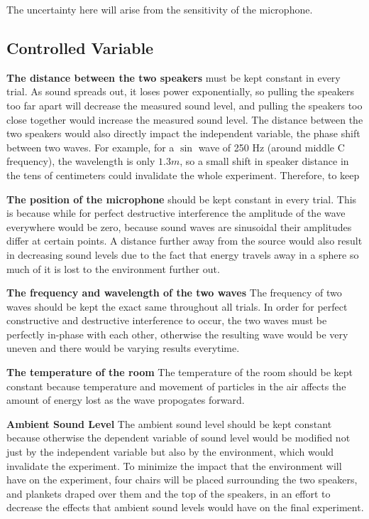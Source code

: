 \documentclass[index]{subfiles}
\begin{document}
The uncertainty here will arise from the sensitivity of the microphone.

\subsection{Controlled Variable}

\textbf{The distance between the two speakers} must be kept constant in every trial. As sound spreads out, it loses power exponentially, so pulling the speakers too far apart will decrease the measured sound level, and pulling the speakers too close together would increase the measured sound level. The distance between the two speakers would also directly impact the independent variable, the phase shift between two waves. For example, for a \(\sin\) wave of 250 Hz (around middle C frequency), the wavelength is only \(1.3m\), so a small shift in speaker distance in the tens of centimeters could invalidate the whole experiment. Therefore, to keep 

\textbf{The position of the microphone} should be kept constant in every trial. This is because while for perfect destructive interference the amplitude of the wave everywhere would be zero, because sound waves are sinusoidal their amplitudes differ at certain points. A distance further away from the source would also result in decreasing sound levels due to the fact that energy travels away in a sphere so much of it is lost to the environment further out.

\textbf{The frequency and wavelength of the two waves} The frequency of two waves should be kept the exact same throughout all trials. In order for perfect constructive and destructive interference to occur, the two waves must be perfectly in-phase with each other, otherwise the resulting wave would be very uneven and there would be varying results everytime.

\textbf{The temperature of the room} The temperature of the room should be kept constant because temperature and movement of particles in the air affects the amount of energy lost as the wave propogates forward.

\textbf{Ambient Sound Level} The ambient sound level should be kept constant because otherwise the dependent variable of sound level would be modified not just by the independent variable but also by the environment, which would invalidate the experiment. To minimize the impact that the environment will have on the experiment, four chairs will be placed surrounding the two speakers, and plankets draped over them and the top of the speakers, in an effort to decrease the effects that ambient sound levels would have on the final experiment.
\end{document}
